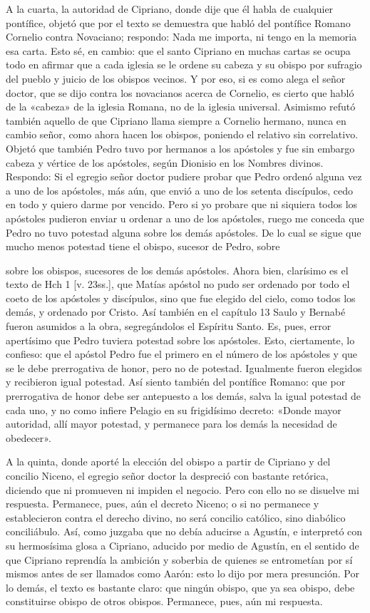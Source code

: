 A la cuarta, la autoridad de Cipriano, donde dije que él habla de cualquier pontífice, objetó que por el texto se demuestra que habló del pontífice Romano Cornelio contra Novaciano; respondo: Nada me importa, ni tengo en la memoria esa carta. Esto sé, en cambio: que el santo Cipriano en muchas cartas se ocupa todo en afirmar que a cada iglesia se le ordene su cabeza y su obispo por sufragio del pueblo y juicio de los obispos vecinos. Y por eso, si es como alega el señor doctor, que se dijo contra los novacianos acerca de Cornelio, es cierto que habló de la «cabeza» de la iglesia Romana, no de la iglesia universal. Asimismo refutó también aquello de que Cipriano llama siempre a Cornelio hermano, nunca en cambio señor, como ahora hacen los obispos, poniendo el relativo sin correlativo. Objetó que también Pedro tuvo por hermanos a los apóstoles y fue sin embargo cabeza y vértice de los apóstoles, según Dionisio en los Nombres divinos. Respondo: Si el egregio señor doctor pudiere probar que Pedro ordenó alguna vez a uno de los apóstoles, más aún, que envió a uno de los setenta discípulos, cedo en todo y quiero darme por vencido. Pero si yo probare que ni siquiera todos los apóstoles pudieron enviar u ordenar a uno de los apóstoles, ruego me conceda que Pedro no tuvo potestad alguna sobre los demás apóstoles. De lo cual se sigue que mucho menos potestad tiene el obispo, sucesor de Pedro, sobre \marginpar{\small[265]}

sobre los obispos, sucesores de los demás apóstoles. Ahora bien, clarísimo es el texto de Hch 1 [v. 23ss.], que Matías apóstol no pudo ser ordenado por todo el coeto de los apóstoles y discípulos, sino que fue elegido del cielo, como todos los demás, y ordenado por Cristo. Así también en el capítulo 13 Saulo y Bernabé fueron asumidos a la obra, segregándolos el Espíritu Santo. Es, pues, error apertísimo que Pedro tuviera potestad sobre los apóstoles. Esto, ciertamente, lo confieso: que el apóstol Pedro fue el primero en el número de los apóstoles y que se le debe prerrogativa de honor, pero no de potestad. Igualmente fueron elegidos y recibieron igual potestad. Así siento también del pontífice Romano: que por prerrogativa de honor debe ser antepuesto a los demás, salva la igual potestad de cada uno, y no como infiere Pelagio en su frigidísimo decreto: «Donde mayor autoridad, allí mayor potestad, y permanece para los demás la necesidad de obedecer».

A la quinta, donde aporté la elección del obispo a partir de Cipriano y del concilio Niceno, el egregio señor doctor la despreció con bastante retórica, diciendo que ni promueven ni impiden el negocio. Pero con ello no se disuelve mi respuesta. Permanece, pues, aún el decreto Niceno; o si no permanece y establecieron contra el derecho divino, no será concilio católico, sino diabólico conciliábulo. Así, como juzgaba que no debía aducirse a Agustín, e interpretó con su hermosísima glosa a Cipriano, aducido por medio de Agustín, en el sentido de que Cipriano reprendía la ambición y soberbia de quienes se entrometían por sí mismos antes de ser llamados como Aarón: esto lo dijo por mera presunción. Por lo demás, el texto es bastante claro: que ningún obispo, que ya sea obispo, debe constituirse obispo de otros obispos. Permanece, pues, aún mi respuesta.

